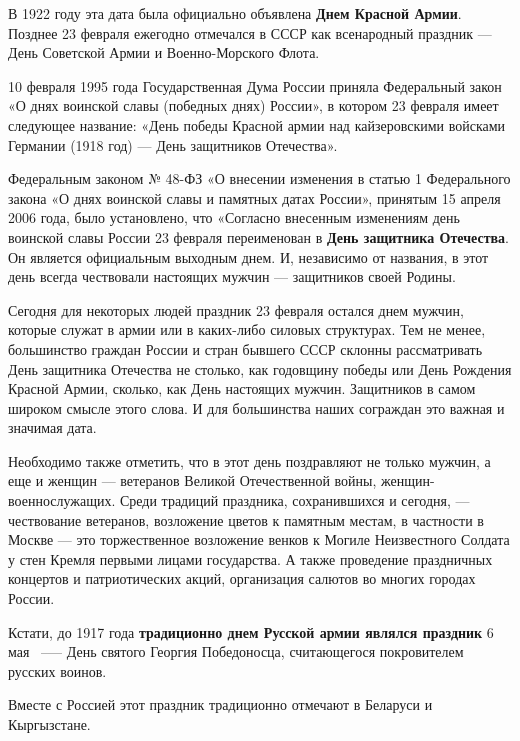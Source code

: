 \par В 1922 году эта дата была официально объявлена \textbf{Днем Красной Армии}. Позднее 23 февраля
ежегодно отмечался в СССР как всенародный праздник — День Советской Армии и Военно-Морского Флота.

\par 10 февраля 1995 года Государственная Дума России приняла Федеральный закон «О днях воинской славы
(победных днях) России», в котором 23 февраля имеет следующее название: «День победы Красной армии над
кайзеровскими войсками Германии (1918 год) — День защитников Отечества».

\par Федеральным законом № 48-ФЗ «О внесении изменения в статью 1 Федерального закона «О днях воинской
славы и памятных датах России», принятым 15 апреля 2006 года, было установлено, что «Согласно внесенным
изменениям день воинской славы России 23 февраля переименован в \textbf{День защитника Отечества}. Он
является официальным выходным днем. И, независимо от названия, в этот день всегда чествовали настоящих
мужчин — защитников своей Родины.

\par Сегодня для некоторых людей праздник 23 февраля остался днем мужчин, которые служат в армии или в
каких-либо силовых структурах. Тем не менее, большинство граждан России и стран бывшего СССР склонны
рассматривать День защитника Отечества не столько, как годовщину победы или День Рождения Красной Армии,
сколько, как День настоящих мужчин. Защитников в самом широком смысле этого слова. И для большинства
наших сограждан это важная и значимая дата.

\par Необходимо также отметить, что в этот день поздравляют не только мужчин, а еще и женщин — ветеранов
Великой Отечественной войны, женщин-военнослужащих. Среди традиций праздника, сохранившихся и сегодня, —
чествование ветеранов, возложение цветов к памятным местам, в частности в Москве — это торжественное
возложение венков к Могиле Неизвестного Солдата у стен Кремля первыми лицами государства. А также
проведение праздничных концертов и патриотических акций, организация салютов во многих городах России.

\par Кстати, до 1917 года \textbf{традиционно днем Русской армии являлся праздник} 6 мая ~--— День святого Георгия Победоносца, считающегося покровителем русских воинов.

\par Вместе с Россией этот праздник традиционно отмечают в Беларуси и Кыргызстане.
